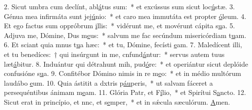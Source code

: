2. Sicut umbra cum declínt, abl\uline{á}tus sum:~* et excússus sum sicut loc\uline{ú}stæ.
3. Génua mea infirmáta sunt  jej\uline{ú}nio:~* et caro mea immutáta est propter \uline{ó}leum.
4. Et ego factus sum oppróbrum \uline{i}llis:~* vidérunt me, et movérunt cápita s\uline{u}a.
5. Adjuva me, Dómine, Dus m\uline{e}us:~* salvum me fac secúndum misericórdiam t\uline{u}am.
6. Et sciant quia mnus t\uline{u}a hæc:~* et tu, Dómine, fecísti \uline{e}am.
7. Maledícent illi, et tu benedíces:~† qui insúrgunt in me, cnfund\uline{á}ntur:~* servus autem tuus læt\uline{á}bitur.
8. Induántur qui détrahunt mih, pud\uline{ó}re:~* et operiántur sicut deplóide confusióne s\uline{u}a.
9. Confitébor Dómino nimis in re m\uline{e}o:~* et in médio multórum laudábo \uline{e}um.
10. Quia ástitit a dxtris p\uline{áu}peris,~* ut salvam fáceret a persequéntibus ánimam m\uline{e}am.
11. Glória Patr, et F\uline{í}lio,~* et Spirítui S\uline{a}ncto.
12. Sicut erat in princípio, et nnc, et s\uline{e}mper,~* et in sǽcula sæculórum. \uline{A}men.
